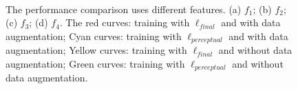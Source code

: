 \documentclass[journal]{IEEEtran}
\begin{document}

\begin{figure}[t]
	\centering
	\\
	\vspace{-2mm}
	\caption{The performance comparison uses different features. (a) $f_1$; (b) $f_2$; (c) $f_3$;
		(d) $f_4$. 
		The red curves: training with $\ell_{final}$ and with data augmentation;
		Cyan curves: training with $\ell_{perceptual}$ and with data augmentation;
		Yellow curves: training with $\ell_{final}$ and without data augmentation;
		Green curves: training with $\ell_{perceptual}$ and without data augmentation. }
	\vspace{-2mm}
	\label{fig:compare_acc}
\end{figure}
\end{document}
